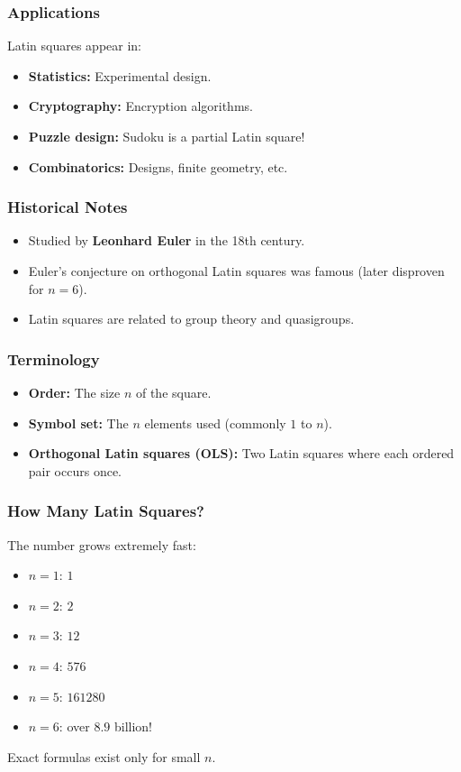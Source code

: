 \documentclass{beamer}
\begin{document}
\begin{frame}
\frametitle{Applications}
Latin squares appear in:
\begin{itemize}
  \item \textbf{Statistics:} Experimental design.
  \item \textbf{Cryptography:} Encryption algorithms.
  \item \textbf{Puzzle design:} Sudoku is a partial Latin square!
  \item \textbf{Combinatorics:} Designs, finite geometry, etc.
\end{itemize}
\end{frame}

\begin{frame}
\frametitle{Historical Notes}
\begin{itemize}
  \item Studied by \textbf{Leonhard Euler} in the 18th century.
  \item Euler's conjecture on orthogonal Latin squares was famous (later disproven for $n=6$).
  \item Latin squares are related to group theory and quasigroups.
\end{itemize}
\end{frame}

\begin{frame}
\frametitle{Terminology}
\begin{itemize}
  \item \textbf{Order:} The size $n$ of the square.
  \item \textbf{Symbol set:} The $n$ elements used (commonly $1$ to $n$).
  \item \textbf{Orthogonal Latin squares (OLS):} Two Latin squares where each ordered pair occurs once.
\end{itemize}
\end{frame}

\begin{frame}
\frametitle{How Many Latin Squares?}
The number grows extremely fast:
\begin{itemize}
  \item $n = 1$: $1$
  \item $n = 2$: $2$
  \item $n = 3$: $12$
  \item $n = 4$: $576$
  \item $n = 5$: $161280$
  \item $n = 6$: over $8.9$ billion!
\end{itemize}
\pause
Exact formulas exist only for small $n$.
\end{frame}
\end{document}
